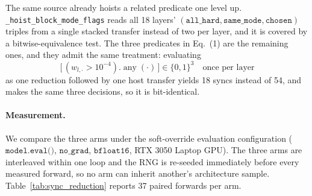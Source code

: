 \documentclass[11pt, a4paper]{article}
\begin{document}
The same source already hoists a related predicate one level up. \texttt{\_hoist\_block\_mode\_flags} reads all 18 layers' $(\texttt{all\_hard}, \texttt{same\_mode}, \texttt{chosen})$ triples from a single stacked transfer instead of two per layer, and it is covered by a bitwise-equivalence test. The three predicates in Eq.~(1) are the remaining ones, and they admit the same treatment: evaluating
\begin{equation}
    \bigl[\,(w_{l,\cdot} > 10^{-4}).\operatorname{any}(\cdot)\,\bigr] \in \{0,1\}^{3}
\quad\text{once per layer}
\end{equation}
as one reduction followed by one host transfer yields 18 syncs instead of 54, and makes the same three decisions, so it is bit-identical.

\paragraph{Measurement.} We compare the three arms under the soft-override evaluation configuration ($\texttt{model.eval()}$, $\texttt{no\_grad}$, $\texttt{bfloat16}$, RTX 3050 Laptop GPU). The three arms are interleaved within one loop and the RNG is re-seeded immediately before every measured forward, so no arm can inherit another's architecture sample. Table~\ref{tab:sync_reduction} reports 37 paired forwards per arm.

\begin{table}[h]
\centering
\caption{\textbf{Device-to-Host Synchronization Reduction in Soft Evaluation (Probe 2).} 37 interleaved paired forwards per arm on an RTX 3050 Laptop GPU under \texttt{bfloat16}; $\mathit{se}$ is the standard error of the mean.}
\label{tab:sync_reduction}
\small
{}
\end{table}
\end{document}
